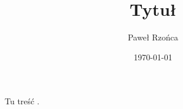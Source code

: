 \documentclass[a4paper; 11pt]{article}
\title{Tytuł}
\author{Paweł Rzońca}
\date{\today}
\begin{document}
\maketitle

Tu treść \cite{example}.






\end{document}
